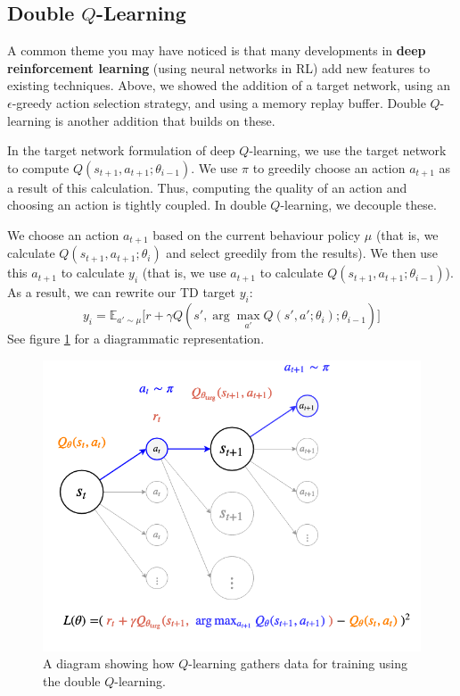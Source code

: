 \documentclass[journal, onecolumn, 12pt, draftclsnofoot]{IEEEtran}
\numberwithin{equation}{section}
\newcommand{\kword}[1]{\textbf{#1}}
\begin{document}
		\subsection{Double $Q$-Learning}
		\par A common theme you may have noticed is that many developments in \kword{deep reinforcement learning} (using neural networks in RL) add new features to existing techniques. Above, we showed the addition of a target network, using an $\epsilon$-greedy action selection strategy, and using a memory replay buffer. Double $Q$-learning is another addition that builds on these.
		\par In the target network formulation of deep $Q$-learning, we use the target network to compute $Q(s_{t+1}, a_{t+1}; \theta_{i-1})$. We use $\pi$ to greedily choose an action $a_{t+1}$ as a result of this calculation. Thus, computing the quality of an action and choosing an action is tightly coupled. In double $Q$-learning, we decouple these.
		\par We choose an action $a_{t+1}$ based on the current behaviour policy $\mu$ (that is, we calculate $Q(s_{t+1},a_{t+1}; \theta_i)$ and select greedily from the results). We then use this $a_{t+1}$ to calculate $y_i$ (that is, we use $a_{t+1}$ to calculate $Q(s_{t+1}, a_{t+1}; \theta_{i-1})$). As a result, we can rewrite our TD target $y_i$:
		\begin{equation}
			\label{eqn:y_i_double}
			y_i = \mathbb{E}_{a' \sim \mu} \big[ r + \gamma Q(s', \arg \max_{a'} Q(s', a'; \theta_i); \theta_{i-1}) \big]
		\end{equation}
		See figure \ref{fig:state-transition-q-learning-loss-double} for a diagrammatic representation.
		\begin{figure}[ht]
			\centering
			\includegraphics[scale=0.5]{fig/state-transition-q-learning-loss-double.png}
			\caption{A diagram showing how $Q$-learning gathers data for training using the double $Q$-learning.}
			\label{fig:state-transition-q-learning-loss-double}
		\end{figure}
\end{document}
